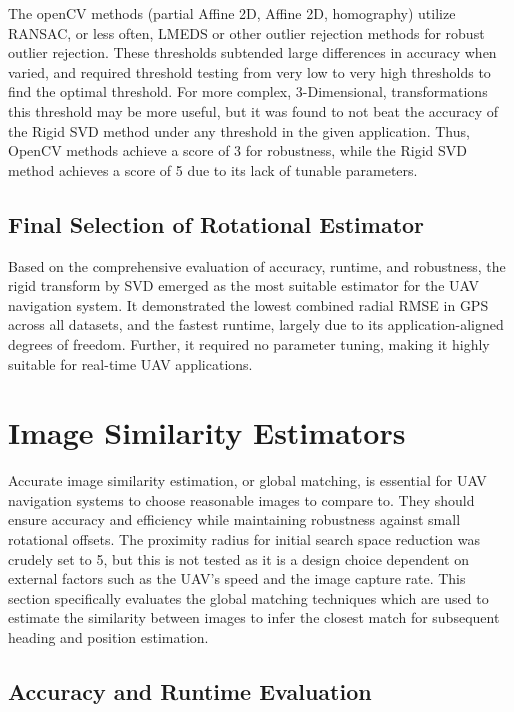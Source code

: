 The openCV methods (partial Affine 2D, Affine 2D, homography) utilize RANSAC, or less often, LMEDS or other outlier rejection methods for robust outlier rejection. These thresholds subtended large differences in accuracy when varied, and required threshold testing from very low to very high thresholds to find the optimal threshold. For more complex, 3-Dimensional, transformations this threshold may be more useful, but it was found to not beat the accuracy of the Rigid SVD method under any threshold in the given application. Thus, OpenCV methods achieve a score of 3 for robustness, while the Rigid SVD method achieves a score of 5 due to its lack of tunable parameters. 

\subsection{Final Selection of Rotational Estimator}

Based on the comprehensive evaluation of accuracy, runtime, and robustness, the rigid transform by SVD emerged as the most suitable estimator for the UAV navigation system. It demonstrated the lowest combined radial RMSE in GPS across all datasets, and the fastest runtime, largely due to its application-aligned degrees of freedom. Further, it required no parameter tuning, making it highly suitable for real-time UAV applications.





\section{Image Similarity Estimators}

Accurate image similarity estimation, or global matching, is essential for UAV navigation systems to choose reasonable images to compare to. They should ensure accuracy and efficiency while maintaining robustness against small rotational offsets. The proximity radius for initial search space reduction was crudely set to 5, but this is not tested as it is a design choice dependent on external factors such as the UAV's speed and the image capture rate. This section specifically evaluates the global matching techniques which are used to estimate the similarity between images to infer the closest match for subsequent heading and position estimation. 


\subsection{Accuracy and Runtime Evaluation}


